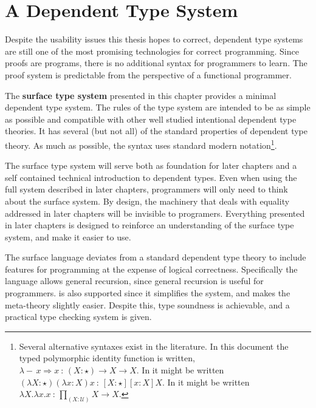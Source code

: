 \chapter{A Dependent Type System}
\label{chapter:Surface}
\thispagestyle{myheadings}
 
 
Despite the usability issues this thesis hopes to correct, dependent type systems are still one of the most promising technologies for correct programming.
Since proofs are programs, there is no additional syntax for programmers to learn.
The proof system is predictable from the perspective of a functional programmer.
 
The \textbf{surface type system} presented in this chapter provides a minimal dependent type system.
The rules of the type system are intended to be as simple as possible and compatible with other well studied intentional dependent type theories.
It has several (but not all) of the standard properties of dependent type theory.
As much as possible, the syntax uses standard modern notation\footnote{
 Several alternative syntaxes exist in the literature.
 In this document the typed polymorphic identity function is written, $\lambda-\,x\Rightarrow x\ :\,\left(X:\star\right)\rightarrow X\rightarrow X$.
 In \cite{10.1016/0890-5401(88)90005-3} it might be written $\left(\lambda X:\star\right)\left(\lambda x:X\right)x\ :\,\left[X:\star\right]\left[x:X\right]X$.
 In \cite{HoTTbook} it might be written $\lambda X.\lambda x.x\ :\,\underset{\left(X:\mathcal{U}\right)}{\prod}X\rightarrow X$.}.
 
The surface type system will serve both as foundation for later chapters and a self contained technical introduction to dependent types.
Even when using the full system described in later chapters, programmers will only need to think about the surface system.
By design, the machinery that deals with equality addressed in later chapters will be invisible to programers.
Everything presented in later chapters is designed to reinforce an understanding of the surface type system, and make it easier to use.
 
The surface language deviates from a standard dependent type theory to include features for programming at the expense of logical correctness.
Specifically the language allows general recursion, since general recursion is useful for programmers.
\Tit{} is also supported since it simplifies the system, and makes the meta-theory slightly easier.
Despite this, type soundness is achievable, and a practical type checking system is given.
 

